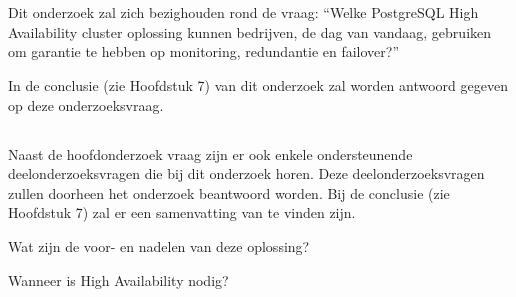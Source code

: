 \section{}
\label{sec:onderzoeksvraag}

\subsection{}
\label{subsec:Hoofdonderzoeksvraag}

Dit onderzoek zal zich bezighouden rond de vraag: “Welke PostgreSQL High Availability cluster oplossing kunnen bedrijven, de dag van vandaag, gebruiken om garantie te hebben op monitoring, redundantie en failover?”

In de conclusie (zie Hoofdstuk 7) van dit onderzoek zal worden antwoord gegeven op deze onderzoeksvraag.
\subsection{}
\label{subsec:Deelonderzoeksvraag}

Naast de hoofdonderzoek vraag zijn er ook enkele ondersteunende deelonderzoeksvragen die bij dit onderzoek horen. Deze deelonderzoeksvragen zullen doorheen het onderzoek beantwoord worden. Bij de conclusie (zie Hoofdstuk 7) zal er een samenvatting van te vinden zijn.

 \begin{description}
    \item
    \item[$\cdot$] Wat zijn de voor- en nadelen van deze oplossing?
    \item[$\cdot$] Wanneer is High Availability nodig?
\end{description}


\section{}
\label{sec:onderzoeksdoelstelling}

